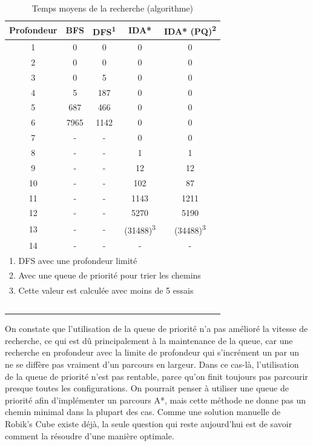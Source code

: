 \documentclass[fleqn,10pt,french]{SelfArx} %
\begin{document}
\begin{table}[htbp]
\centering
\begin{tabular}{ccccc}
\hline
\rowcolor{blue!20} \rule{0pt}{12pt} \textbf{Profondeur} & \textbf{BFS} & \textbf{DFS}\textsuperscript{1} & \textbf{IDA*} &  \textbf{IDA* (PQ)\textsuperscript{2}}\\
\hline
1 & 0 & 0 & 0 & 0  \\
2 & 0 & 0 & 0 & 0 \\
3 & 0 & 5 & 0 & 0 \\
4 & 5 & 187 & 0 & 0 \\
5 & 687 & 466 & 0 & 0 \\
6 & 7965 & 1142 & 0 & 0  \\
7 & - & - & 0 & 0 \\
8 & - & - & 1 & 1 \\
9 & - & - & 12 & 12 \\
10 & - & - & 102 & 87 \\
11 & - & - & 1143 & 1211 \\
12 & - & - & 5270 & 5190 \\
13 & - & - & (31488)\textsuperscript{3} & (34488)\textsuperscript{3} \\
14 & - & - & - & - \\
\hline
\multicolumn{5}{l}{\small{1. DFS avec une profondeur limité}} \\
\multicolumn{5}{l}{\small{2. Avec une queue de priorité pour trier les chemins}} \\
\multicolumn{5}{l}{\small{3. Cette valeur est calculée avec moins de 5 essais}} \\
\hline
~\\
\end{tabular}
\caption{Temps moyens de la recherche (algorithme)}
\end{table}

\indent
On constate que l’utilisation de la queue de priorité n’a pas amélioré la vitesse de recherche, ce qui est dû principalement à la maintenance de la queue, car une recherche en profondeur avec la limite de profondeur qui s’incrément un par un ne se diffère pas vraiment d’un parcours en largeur. Dans ce cas-là, l’utilisation de la queue de priorité n’est pas rentable, parce qu’on finit toujours pas parcourir presque toutes les configurations. On pourrait penser à utiliser une queue de priorité afin d’implémenter un parcours A*, mais cette méthode ne donne pas un chemin minimal dans la plupart des cas. Comme une solution manuelle de Robik’s Cube existe déjà, la seule question qui reste aujourd’hui est de savoir comment la résoudre d’une manière optimale.
\end{document}
